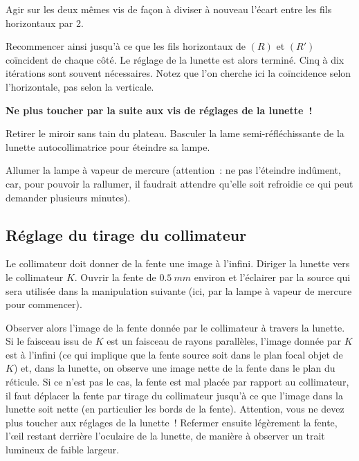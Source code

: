 \documentclass[a4paper, 12pt, final, garamond]{book}
\begin{document}
 Agir sur les deux mêmes vis de façon à diviser à nouveau l'écart entre
les fils horizontaux par 2. 

\medskip

 Recommencer ainsi jusqu'à ce que les fils horizontaux de $(R)$ et
$(R')$ coïncident de chaque côté. Le réglage de la lunette est alors terminé.
Cinq à dix itérations sont souvent nécessaires. Notez que l'on cherche ici la
coïncidence selon l'horizontale, pas selon la verticale. 

\medskip

\textbf{Ne plus toucher par la suite aux vis de réglages de la lunette~!}

\medskip

Retirer le miroir sans tain du plateau.
Basculer la lame semi-réfléchissante de la lunette autocollimatrice pour
éteindre sa lampe.

\medskip

Allumer la lampe à vapeur de mercure (attention~: ne pas l'éteindre indûment,
car, pour pouvoir la rallumer, il faudrait attendre qu'elle soit refroidie ce
qui peut demander plusieurs minutes).

\subsection{Réglage du tirage du collimateur}

Le collimateur doit donner de la fente une image à l'infini.
Diriger la lunette vers le collimateur $K$. Ouvrir la fente de $\SI{0,5}{mm}$
environ et l'éclairer par la source qui sera utilisée dans la manipulation
suivante (ici, par la lampe à vapeur de mercure pour commencer).

\medskip

Observer alors l'image de la fente donnée par le collimateur à travers la
lunette. Si le faisceau issu de $K$ est un faisceau de rayons parallèles,
l'image donnée par $K$ est à l'infini (ce qui implique que la fente source soit
dans le plan focal objet de $K$) et, dans la lunette, on observe une image nette
de la fente dans le plan du réticule. Si ce n'est pas le cas, la fente est mal
placée par rapport au collimateur, il faut déplacer la fente par tirage du
collimateur jusqu'à ce que l'image dans la lunette soit nette (en particulier
les bords de la fente). Attention, vous ne devez plus toucher aux réglages de la
lunette~! Refermer ensuite légèrement la fente, l'œil restant derrière
l'oculaire de la lunette, de manière à observer un trait lumineux de faible
largeur. 
\end{document}
